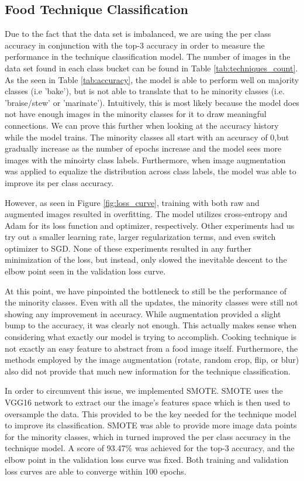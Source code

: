 \documentclass[10pt,twocolumn,letterpaper]{article}
\begin{document}
\subsection{Food Technique Classification}
Due to the fact that the data set is imbalanced, we are using the per class accuracy in conjunction with the top-3 accuracy in order to measure the performance in the technique classification model. The number of images in the data set found in each class bucket can be found in Table \ref{tab:techniques_count}. As the seen in Table \ref{tab:accuracy}, the model is able to perform well on majority classes (i.e 'bake'), but is not able to translate that to he minority classes (i.e. 'braise/stew' or 'marinate'). Intuitively, this is most likely because the model does not have enough images in the minority classes for it to draw meaningful connections. We can prove this further when looking at the accuracy history while the model trains. The minority classes all start with an accuracy of 0,but gradually increase as the number of epochs increase and the model sees more images with the minoirty class labels. Furthermore, when image augmentation was applied to equalize the distribution across class labels, the model was able to improve its per class accuracy. 

However, as seen in Figure \ref{fig:loss_curve}, training with both raw and augmented images resulted in overfitting. The model utilizes cross-entropy and Adam for its loss function and optimizer, respectively. Other experiments had us try out a smaller learning rate, larger regularization terms, and even switch optimizer to SGD. None of these experiments resulted in any further minimization of the loss, but instead, only slowed the inevitable descent to the elbow point seen in the validation loss curve.   

At this point, we have pinpointed the bottleneck to still be the performance of the minority classes. Even with all the updates, the minority classes were still not showing any improvement in accuracy. While augmentation provided a slight bump to the accuracy, it was clearly not enough. This actually makes sense when considering what exactly our model is trying to accomplish. Cooking technique is not exactly an easy feature to abstract from a food image itself. Furthermore, the methods employed by the image augmentation (rotate, random crop, flip, or blur) also did not provide that much new information for the technique classification.  

In order to circumvent this issue, we implemented SMOTE. SMOTE uses the VGG16 network to extract our the image's features space which is then used to oversample the data. This provided to be the key needed for the technique model to improve its classification. SMOTE was able to provide more image data points for the minority classes, which in turned improved the per class accuracy in the technique model. A score of 93.47\% was achieved for the top-3 accuracy, and the elbow point in the validation loss curve was fixed. Both training and validation loss curves are able to converge within 100 epochs.
\end{document}

